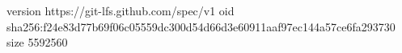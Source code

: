 version https://git-lfs.github.com/spec/v1
oid sha256:f24e83d77b69f06c05559dc300d54d66d3e60911aaf97ec144a57ce6fa293730
size 5592560
